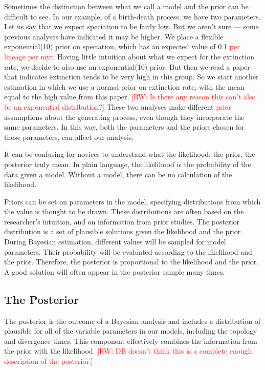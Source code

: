 \documentclass[11pt]{article}
\makeatletter
\newcommand{\rw}[1]{{\textcolor{red}{[RW: #1]}}} %
\newcommand{\edit}[1]{{\textcolor{red}{#1}}} %
\newenvironment{boxedtext}[1]{%
  \begin{mdframed}[frametitle=#1,
    frametitlefont=\scshape\mdseries\sffamily,
    frametitlealignment=\centering,
    backgroundcolor=black!20,
    hidealllines=true,
    innerleftmargin=11\p@,innerrightmargin=11\p@,
    frametitleaboveskip=0.5\baselineskip,
    innerbottommargin=0.5\baselineskip,
    skipabove=\baselineskip,skipbelow=0.5\baselineskip]
}{%
  \end{mdframed}%
}
\makeatother
\begin{document}
Sometimes the distinction between what we call a model and the prior can be difficult to see.
In our example, of a birth-death process, we have two parameters.
Let us say that we expect speciation to be fairly low.
But we aren't sure --- some previous analyses have indicated it may be higher.
We place a flexible exponential(10) prior on speciation, which has an expected value of 0.1 \edit{per lineage per myr}.
Having little intuition about what we expect for the extinction rate, we decide to also use an exponential(10) prior.
But then we read a paper that indicates extinction tends to be very high in this group.
So we start another estimation in which we use a normal prior on extinction rate, with the mean equal to the high value from this paper. 
\rw{Is there any reason this can't also be an exponential distribution?}
These two analyses make different \edit{prior} assumptions about the generating process, even though they incorporate the same parameters. 
In this way, both the parameters and the priors chosen for those parameters, can affect our analysis.

\clearpage
\begin{boxedtext}{The likelihood\, the prior\, and the posterior}

It can be confusing for novices to understand what the likelihood, the prior, the posterior truly mean.
In plain language, the likelihood is the probability of the data given a model.
Without a model, there can be no calculation of the likelihood.

Priors can be set on parameters in the model, specifying distributions from which the value is thought to be drawn.
These distributions are often based on the researcher's intuition, and on information from prior studies.
The posterior distribution is a set of plausible solutions given the likelihood and the prior.
During Bayesian estimation, different values will be sampled for model parameters.
Their probability will be evaluated according to the likelihood and the prior.
Therefore, the posterior is proportional to the likelihood and the prior.
A good solution will often appear in the posterior sample many times.

\end{boxedtext}

\subsection{The Posterior}

The posterior is the outcome of a Bayesian analysis and includes a distribution of plausible for all of the variable parameters in our models, including the topology and divergence times.
This component effectively combines the information from the prior with the likelihood. \rw{DB doesn't think this is a complete enough description of the posterior.}
\end{document}
